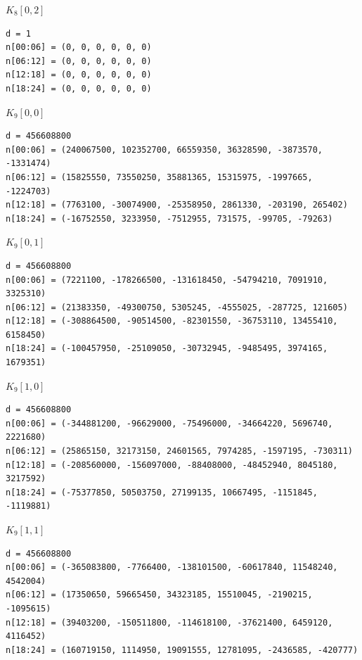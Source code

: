 \par\medskip\noindent\begin{minipage}{\textwidth}
\textbf{$K_{8}[0,2]$}
\begin{Verbatim}[fontsize=\fontsize{8}{9.4}\selectfont]
d = 1
n[00:06] = (0, 0, 0, 0, 0, 0)
n[06:12] = (0, 0, 0, 0, 0, 0)
n[12:18] = (0, 0, 0, 0, 0, 0)
n[18:24] = (0, 0, 0, 0, 0, 0)
\end{Verbatim}
\end{minipage}

\par\medskip\noindent\begin{minipage}{\textwidth}
\textbf{$K_{9}[0,0]$}
\begin{Verbatim}[fontsize=\fontsize{8}{9.4}\selectfont]
d = 456608800
n[00:06] = (240067500, 102352700, 66559350, 36328590, -3873570, -1331474)
n[06:12] = (15825550, 73550250, 35881365, 15315975, -1997665, -1224703)
n[12:18] = (7763100, -30074900, -25358950, 2861330, -203190, 265402)
n[18:24] = (-16752550, 3233950, -7512955, 731575, -99705, -79263)
\end{Verbatim}
\end{minipage}

\par\medskip\noindent\begin{minipage}{\textwidth}
\textbf{$K_{9}[0,1]$}
\begin{Verbatim}[fontsize=\fontsize{8}{9.4}\selectfont]
d = 456608800
n[00:06] = (7221100, -178266500, -131618450, -54794210, 7091910, 3325310)
n[06:12] = (21383350, -49300750, 5305245, -4555025, -287725, 121605)
n[12:18] = (-308864500, -90514500, -82301550, -36753110, 13455410, 6158450)
n[18:24] = (-100457950, -25109050, -30732945, -9485495, 3974165, 1679351)
\end{Verbatim}
\end{minipage}

\par\medskip\noindent\begin{minipage}{\textwidth}
\textbf{$K_{9}[1,0]$}
\begin{Verbatim}[fontsize=\fontsize{8}{9.4}\selectfont]
d = 456608800
n[00:06] = (-344881200, -96629000, -75496000, -34664220, 5696740, 2221680)
n[06:12] = (25865150, 32173150, 24601565, 7974285, -1597195, -730311)
n[12:18] = (-208560000, -156097000, -88408000, -48452940, 8045180, 3217592)
n[18:24] = (-75377850, 50503750, 27199135, 10667495, -1151845, -1119881)
\end{Verbatim}
\end{minipage}

\par\medskip\noindent\begin{minipage}{\textwidth}
\textbf{$K_{9}[1,1]$}
\begin{Verbatim}[fontsize=\fontsize{8}{9.4}\selectfont]
d = 456608800
n[00:06] = (-365083800, -7766400, -138101500, -60617840, 11548240, 4542004)
n[06:12] = (17350650, 59665450, 34323185, 15510045, -2190215, -1095615)
n[12:18] = (39403200, -150511800, -114618100, -37621400, 6459120, 4116452)
n[18:24] = (160719150, 1114950, 19091555, 12781095, -2436585, -420777)
\end{Verbatim}
\end{minipage}

